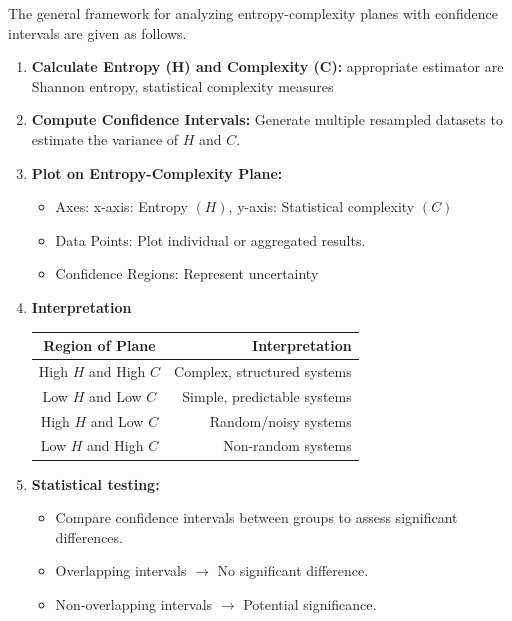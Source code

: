 The general framework for analyzing entropy-complexity planes with confidence intervals are given as follows.
\begin{enumerate}
	\item \textbf{Calculate Entropy (H) and Complexity (C):} 
	appropriate estimator are Shannon entropy, statistical complexity measures 
	\item \textbf{Compute Confidence Intervals:}
	Generate multiple resampled datasets to estimate the variance of $H$ and $C$.
	\item \textbf{Plot on Entropy-Complexity Plane:}
	\begin{itemize}
		\item Axes: x-axis: Entropy $(H)$, y-axis: Statistical complexity $(C)$
		\item Data Points: Plot individual or aggregated results.
		\item Confidence Regions: Represent uncertainty 
	\end{itemize}
	
	\item \textbf{Interpretation}
	\begin{table}[H]
		\centering
		\begin{tabular}{cr}
			\toprule
			Region of Plane  & Interpretation  \\
			\midrule
			High $H$ and High $C$ & Complex, structured systems \\ 
			Low $H$ and Low $C$ & Simple, predictable systems \\
			High $H$ and Low $C$ & Random/noisy systems \\
			Low $H$ and High $C$ & Non-random systems \\ 
			\bottomrule
		\end{tabular}
	\end{table}
	
	\item \textbf{Statistical testing:}
	\begin{itemize}
		\item Compare confidence intervals between groups to assess significant differences.
		\item Overlapping intervals $\rightarrow$ {No significant difference}.
		\item Non-overlapping intervals $\rightarrow$ Potential significance.
	\end{itemize}
\end{enumerate}







